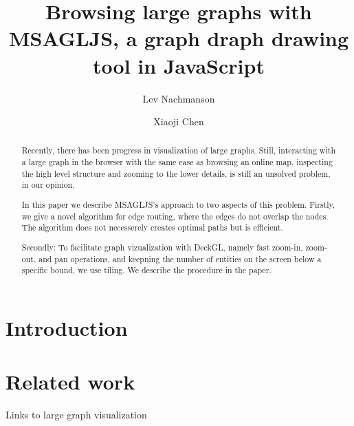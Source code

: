 \documentclass{gd-llncs}
\begin{document}
\title{Browsing large graphs with MSAGLJS, a graph draph drawing tool in JavaScript }
  \author{%
  Lev Nachmanson  \and 
  Xiaoji Chen
  }%
  \maketitle      


\begin{abstract}
Recently, there has been progress in visualization of large graphs. Still, interacting with a large graph in the browser with the same ease as browsing an online map, inspecting the high level structure and zooming to the lower details, is still an unsolved problem, in our opinion. 

In this paper we describe MSAGLJS's approach to two aspects of this problem. Firstly, we give a novel algorithm for edge routing, where the edges do not overlap the nodes. The algorithm does not necesserely creates optimal paths but is efficient. 

Secondly: To facilitate graph vizualization with DeckGL, namely fast zoom-in, zoom-out, and pan operations, and keepning the number of entities on the screen below a specific bound, we use tiling. We describe the procedure in the paper.
\end{abstract}

\nolinenumbers





\section*{Introduction}

\label{sec:intro}
\section*{Related work}
Links to large graph visualization


\cite{graphexp}

\cite{graphviz}

\cite{regraph}
\end{document}
